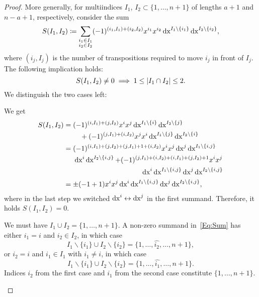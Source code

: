 \documentclass[\MainFolder/Text.tex]{subfiles}
\begin{document}
\begin{proof}
More generally, for multiindices $I_1$, $I_2 \subset \{1,\dotsc, n+1\}$ of lengths $a+1$ and $n-a+1$,  respectively, consider the sum
\begin{equation} \label{Eq:Sum}
S(I_1,I_2) \coloneqq \sum_{\substack{i_1 \in I_1 \\ i_2 \in I_2}} (-1)^{(i_1,I_1) + (i_2,I_2)} x^{i_1} x^{i_2} \operatorname{dx}^{I_1\backslash\{i_1\}} \operatorname{dx}^{I_2\backslash\{i_2\}},
\end{equation}
where $(i_j, I_j)$ is the number of transpositions required to move $i_j$ in front of $I_j$.
The following implication holds: 
\begin{equation*}
 S(I_1, I_2)\neq 0\; \Longrightarrow \; 1 \le |I_1 \cap I_2| \le 2.
\end{equation*}
We distinguish the two cases left: 
\begin{description}[font=\normalfont\itshape]
\item[Case $I_1 \cap I_2 =\{i,j\}$ with $i < j$: ] We get
\begin{align*} 
S(I_1, I_2) &= \begin{multlined}[t] (-1)^{(i,I_1) + (j,I_2)} x^{i} x^j \Diff{x}^{I_1 \backslash\{i\}} \Diff{x}^{I_2 \backslash \{j\}} \\ {}+ (-1)^{(j,I_1) + (i,I_2)} x^{j} x^i \Diff{x}^{I_1 \backslash\{j\}} \Diff{x}^{I_2 \backslash \{i\}} \end{multlined} \\
&=\begin{multlined}[t] (-1)^{(i,I_1) + (j,I_2) + (j,I_1)+1 + (i,I_2)} x^i x^j \Diff{x}^j \Diff{x}^{I_1\backslash\{i,j\}}\\\Diff{x}^i \Diff{x}^{I_2\backslash\{i,j\}} + (-1)^{(j,I_1) + (i,I_2)+(i,I_1)+ (j,I_2)+1} x^i x^j \\ \Diff{x}^i \Diff{x}^{I_1\backslash\{i,j\}}\Diff{x}^j \Diff{x}^{I_2\backslash\{i,j\}} \end{multlined} \\
&= \pm(-1 +  1) x^i x^j \Diff{x}^i \Diff{x}^{I_1\backslash\{i,j\}} \Diff{x}^j\Diff{x}^{I_2\backslash\{i,j\}},
\end{align*}
where in the last step we switched $\operatorname{dx}^i \leftrightarrow \operatorname{dx}^j$ in the first summand.
Therefore, it holds $S(I_1, I_2) = 0$.
\item[Case $I_1 \cap I_2 = \{i\}$:] We must have $I_1 \cup I_2 = \{1,\dotsc,n+1\}$.
A non-zero summand in~\eqref{Eq:Sum} has either $i_1 = i$ and $i_2\in I_2$, in which case \[I_1\backslash \{i_1\} \cup I_2\backslash\{i_2\}= \{1, \dotsc, \widehat{i_2}, \dotsc, n+1\}, \] or $i_2 = i$ and $i_1\in I_1$ with $i_1 \neq i$, in which case \[I_1\backslash \{i_1\} \cup I_2\backslash\{i_2\}= \{1, \dotsc, \widehat{i_1}, \dotsc, n+1\}.\] Indices $i_2$ from the first case and $i_1$ from the second case constitute $\{1,\dotsc,n+1\}$.

\end{description}
\end{proof}
\end{document}
